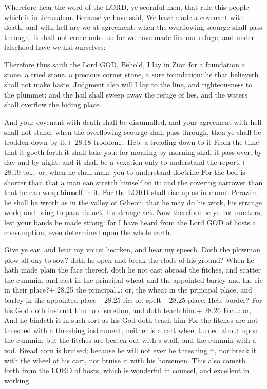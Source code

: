  Wherefore hear the word of the LORD, ye scornful men,
that rule this people which is in Jerusalem.  Because ye
have said, We have made a covenant with death, and with hell are we at
agreement; when the overflowing scourge shall pass through, it shall not
come unto us: for we have made lies our refuge, and under falsehood have
we hid ourselves:

 Therefore thus saith the Lord GOD, Behold, I lay in Zion
for a foundation a stone, a tried stone, a precious corner stone, a sure
foundation: he that believeth shall not make haste. 
Judgment also will I lay to the line, and righteousness to the plummet:
and the hail shall sweep away the refuge of lies, and the waters shall
overflow the hiding place.

 And your covenant with death shall be disannulled, and
your agreement with hell shall not stand; when the overflowing scourge
shall pass through, then ye shall be trodden down by it.+ 28.18
trodden\ldots: Heb. a treading down to it  From the time
that it goeth forth it shall take you: for morning by morning shall it
pass over, by day and by night: and it shall be a vexation only to
understand the report.+ 28.19 to\ldots: or, when he shall make you to
understand doctrine  For the bed is shorter than that a man
can stretch himself on it: and the covering narrower than that he can
wrap himself in it.  For the LORD shall rise up as in mount
Perazim, he shall be wroth as in the valley of Gibeon, that he may do
his work, his strange work; and bring to pass his act, his strange act.
 Now therefore be ye not mockers, lest your bands be made
strong: for I have heard from the Lord GOD of hosts a consumption, even
determined upon the whole earth.

 Give ye ear, and hear my voice; hearken, and hear my
speech.  Doth the plowman plow all day to sow? doth he open
and break the clods of his ground?  When he hath made plain
the face thereof, doth he not cast abroad the fitches, and scatter the
cummin, and cast in the principal wheat and the appointed barley and the
rie in their place?+ 28.25 the principal\ldots: or, the wheat in the
principal place, and barley in the appointed place+ 28.25 rie: or,
spelt+ 28.25 place: Heb. border?  For his God doth instruct
him to discretion, and doth teach him.+ 28.26 For\ldots: or, And he
bindeth it in such sort as his God doth teach him  For the
fitches are not threshed with a threshing instrument, neither is a cart
wheel turned about upon the cummin; but the fitches are beaten out with
a staff, and the cummin with a rod.  Bread corn is bruised;
because he will not ever be threshing it, nor break it with the wheel of
his cart, nor bruise it with his horsemen.  This also
cometh forth from the LORD of hosts, which is wonderful in counsel, and
excellent in working.


